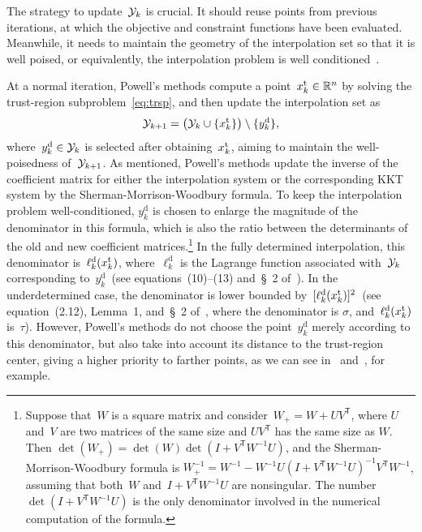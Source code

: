 \documentclass[
    smallextended,  %
    draft,          %
    final,          %
]{svjour3}
\newcommand{\R}{\mathbb{R}}
\newcommand{\T}{\mathsf{T}}
\newcommand{\drop}{{\text{d}}}
\newcommand{\iter}[1][k]{x\ifthenelse{\equal{#1}{}}{}{_{#1}}}
\newcommand{\set}[2][]{#1\{#2#1\}}
\newcommand{\trust}{{\text{t}}}
\newcommand{\xpt}[1][k]{\mathcal{Y}\ifthenelse{\equal{#1}{}}{}{_{#1}}}
\newcommand{\kkt}{KKT\xspace}
\begin{document}
The strategy to update~$\xpt$ is crucial.
It should reuse points from previous iterations, at which the objective and constraint functions
have been evaluated.
Meanwhile, it needs to maintain the geometry of the interpolation set so that it is well poised,
or equivalently, the interpolation problem is well conditioned~\cite{Conn_Scheinberg_Vicente_2009b}.

At a normal iteration, Powell's methods compute a point~$\iter^{\trust} \in \R^n$ by solving the
trust-region subproblem~\eqref{eq:trsp}, and then update the interpolation set as
\begin{equation}
    \label{eq:xpt-update-tr}
    \xpt[k + 1] = \big(\xpt \cup \set{\iter^{\trust}}\big) \setminus \set{y_k^{\drop}},
\end{equation}
where~$y_k^{\drop} \in \xpt$ is selected after obtaining~$\iter^{\trust}$, aiming to maintain the
well-poisedness of~$\xpt[k + 1]$.
As mentioned, Powell's methods update the inverse of the coefficient matrix for either the
interpolation system or the corresponding \kkt system by the Sherman-Morrison-Woodbury formula.
To keep the interpolation problem well-conditioned, $y_k^{\drop}$ is chosen
to enlarge the magnitude of the denominator in this formula, which is also the ratio between
the determinants of the old and new coefficient matrices.\footnote{
    Suppose that~$W$ is a square matrix and consider~$W_+ = W + UV^\T$, where $U$ and~$V$ are two
    matrices of the same size and $UV^\T$ has the same size as $W$.
    Then $\det(W_+) = \det(W)\det(I+V^\T W^{-1}U)$, and the
    Sherman-Morrison-Woodbury formula
    is $W_+^{-1} = W^{-1} -W^{-1}U(I+V^\T W^{-1}U)^{-1} V^\T W^{-1}$, assuming that both~$W$
    and~$I+V^\T W^{-1}U$ are nonsingular.
    The number~$\det(I+V^\T W^{-1}U)$ is the only
    denominator involved in the numerical computation of the formula.
}
In the fully determined interpolation, this denominator is~$\ell_k^\drop(\iter^{\trust})$,
where~$\ell_k^\drop$ is the Lagrange function associated with~$\xpt$ corresponding
to~$y_k^\drop$~(see equations~\mbox{(10)--(13)} and~\S~2 of~\cite{Powell_2001}).
In the underdetermined case, the denominator is lower
bounded by~$[\ell_k^{\drop}(\iter^{\trust})]^2$~(see equation~(2.12), Lemma~1, and~\S~2 of~\cite{Powell_2004c},
where the denominator is $\sigma$, and~$\ell_k^{\drop}(\iter^{\trust})$ is~$\tau$).
However, Powell's methods do not choose the point~$y_k^\drop$ merely according to this denominator, but also
take into account its distance to the trust-region center, giving a higher priority to farther
points, as we can see in~\cite[equation~(56)]{Powell_2002} and~\cite[equations~(7.4)--(7.5)]{Powell_2006}, for example.
\end{document}
